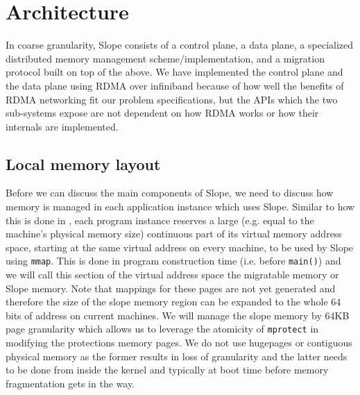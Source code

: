 \section{Architecture}
In coarse granularity, Slope consists of a control plane, a data plane,
a specialized distributed memory management
scheme/implementation, and a migration protocol
built on top
of the above. We have implemented the control plane and the data plane using
RDMA over infiniband because of how well the benefits of RDMA networking
fit our problem specifications, but the APIs which the two
sub-systems expose are not dependent on how RDMA works or how their internals
are implemented.

\subsection{Local memory layout}
Before we can discuss the main components of Slope, we need to discuss how
memory is managed in each application instance which uses Slope. Similar to
how this is done in \cite{memon2018ramp}, each program instance reserves a
large  (e.g. equal to the machine's physical memory size) continuous part
of its virtual memory address space, starting at the same virtual address
on every machine, to be used by Slope using \texttt{mmap}.
This is done in program construction
time (i.e. before \texttt{main()}) and we will call this section of the virtual
address space the migratable memory or Slope memory. Note that mappings for
these pages are not yet generated and therefore the size of the slope memory
region can be expanded to the whole 64 bits of address on current machines.
We will manage the slope memory by 64KB page granularity which allows us to
leverage
the atomicity of \texttt{mprotect} in modifying the protections memory pages.
We do not use hugepages or contiguous physical memory as the former results in
loss of granularity and the latter needs to be done from inside the kernel and
typically at boot time before memory fragmentation gets in the way.

